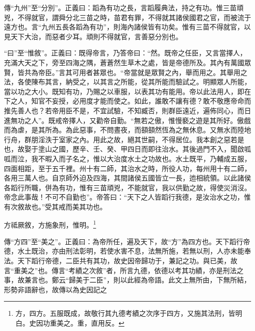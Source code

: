 {\noindent\zhuan{}\fzbyks 傳“九州”至“分別”。正義曰：蹈為有功之長，言蹈履典法，持之有功。惟三苗頑兇，不得就官，謂舜分北三苗之時，苗君有罪，不得就其諸侯國君之官，而被流于遠方也。言“九州五長各蹈為有功”，則海內諸侯皆有功矣。惟有三苗不得就官，以見天下大治，而惡者少耳。頑則不得就官，言善惡分別也。 \par}

{\noindent\shu{}\fzkt “曰”至“惟敘”。正義曰：既得帝言，乃答帝曰：“然。既帝之任臣，又言當擇人，充滿大天之下，旁至四海之隅，蒼蒼然生草木之處，皆是帝德所及。其內有萬國眾賢，皆共為帝臣。”言其可用者甚眾也。“帝當就是眾賢之內，舉而用之。其舉用之法，各使陳布其言，納受之，以其言之所能，從其所能而驗試之。明顯眾人所能，當以功之大小。既知有功，乃賜之以車服，以表其功有能用。帝以此法用人，即在下之人，知官不妄授，必用度才能而使之。如此，誰敢不讓有德？敢不敬應帝命而推先善人也？若帝用臣不是，不宜試驗，不知臧否，則群臣遠近，遍佈同心，而日進無功之人”。既戒帝擇人，又勸帝自勤。“無若之傲，惟慢褻之遊是其所好。傲戲而為虐，是其所為。為此惡事，不問晝夜，而頟頟然恆為之無休息。又無水而陸地行舟，群朋淫泆于室家之內。用此之故，絕其世嗣，不得居位。我本創之惡若是也，故娶于塗山之國，歷辛、壬、癸、甲四日而即往治水。其後過門不入，聞啟呱呱而泣，我不暇入而子名之，惟以大治度水土之功故也。水土既平，乃輔成五服，四面相距，至于五千裡。州十有二師，其治水之時，所役人功，每州用十有二師，各用三萬人也。自京師外迫及四海，其間諸侯五國皆立一長，迆相統領。以此諸侯各蹈行所職，併為有功，惟有三苗頑兇，不能就官，我以供勤之故，得使災消沒。帝念此事哉！不可不自勤也”。帝答曰：“天下之人皆蹈行我德，是汝治水之功，惟有次敘故也。”受其戒而美其功也。 \par}

方祗厥敘，方施象刑，惟明。\footnote{方，四方。五服既成，故敬行其九德考績之次序于四方，又施其法刑，皆明白。史因功重美之。重，直用反。}

{\noindent\zhuan{}\fzbyks 傳“方四”至“美之”。正義曰：為帝所任，遍及天下，故“方”為四方也。天下蹈行帝德，水土既治，亦由刑法彰明，若使水害不息，法無所施，若無以刑，人亦未能奉法。天下蹈行帝德，二臣共有其功，故史因帝歸功于，兼記之功。與已美，故言“重美之”也。傳言“考績之次敘”者，所言九德，依德以考其功績，亦是刑法之事，故兼言也。鄭云“歸美于二臣”，則以此經為帝語。此文上無所由，下無所結，形勢非語辭也，故傳以為史因記之 \par}

